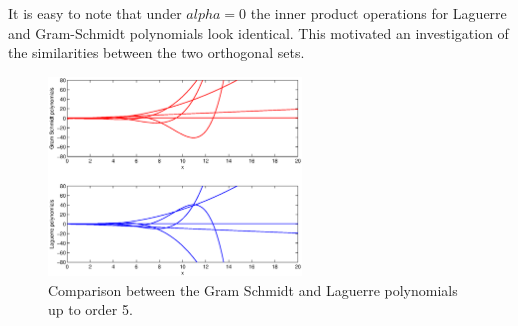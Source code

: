 \documentclass[a4paper]{article}
\numberwithin{equation}{section}
\begin{document}
It is easy to note that under $alpha = 0$ the inner product operations for Laguerre and Gram-Schmidt polynomials look identical. This motivated an investigation of the similarities between the two orthogonal sets.

\begin{figure}
\centering
\includegraphics[width=0.6\textwidth]{gs_laguerre_comparison.eps}
\caption{\label{fig:gslaguerrecomparison}Comparison between the Gram Schmidt and Laguerre polynomials up to order 5.}
\end{figure}
\end{document}
